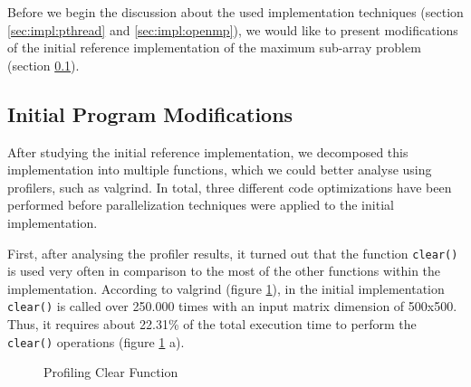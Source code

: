 \documentclass[conference]{IEEEtran}
\begin{document}
Before we begin the discussion about the used implementation techniques (section \ref{sec:impl:pthread} and \ref{sec:impl:openmp}), we would like to present modifications of the initial reference implementation of the maximum sub-array problem (section \ref{sec:impl:modifications}). 

\subsection{Initial Program Modifications}
\label{sec:impl:modifications}

After studying the initial reference implementation, we decomposed this implementation into multiple functions, which we could better analyse using profilers, such as valgrind\cite{VALGRIND}. In total, three different code optimizations have been performed before parallelization techniques were applied to the initial implementation.  

First, after analysing the profiler results, it turned out that the function \texttt{clear()} is used very often in comparison to the most of the other functions within the implementation. According to valgrind (figure \ref{pic:clear}), in the initial implementation \texttt{clear()} is called over 250.000 times with an input matrix dimension of 500x500. Thus, it requires about 22.31\% of the total execution time to perform the \texttt{clear()} operations (figure \ref{pic:clear} a).  

\begin{figure}[h]
  \centering
  \quad
  \caption{Profiling Clear Function}
  \label{pic:clear}
\end{figure}
\end{document}
